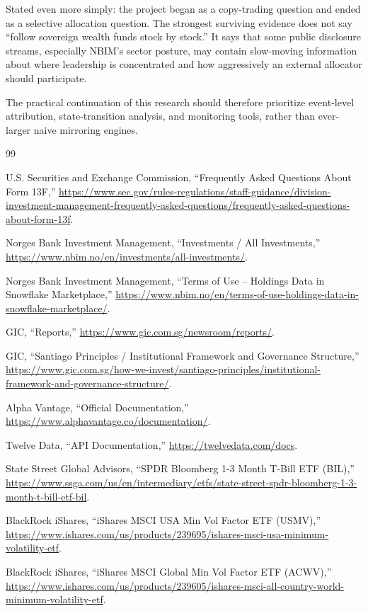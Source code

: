 \documentclass[conference]{IEEEtran}
\begin{document}
Stated even more simply: the project began as a copy-trading question and ended as a selective allocation question. The strongest surviving evidence does not say ``follow sovereign wealth funds stock by stock.'' It says that some public disclosure streams, especially NBIM's sector posture, may contain slow-moving information about where leadership is concentrated and how aggressively an external allocator should participate.

The practical continuation of this research should therefore prioritize event-level attribution, state-transition analysis, and monitoring tools, rather than ever-larger naive mirroring engines.

\begin{thebibliography}{99}

U.S. Securities and Exchange Commission, ``Frequently Asked Questions About Form 13F,'' \url{https://www.sec.gov/rules-regulations/staff-guidance/division-investment-management-frequently-asked-questions/frequently-asked-questions-about-form-13f}.

Norges Bank Investment Management, ``Investments / All Investments,'' \url{https://www.nbim.no/en/investments/all-investments/}.

Norges Bank Investment Management, ``Terms of Use -- Holdings Data in Snowflake Marketplace,'' \url{https://www.nbim.no/en/terms-of-use-holdings-data-in-snowflake-marketplace/}.

GIC, ``Reports,'' \url{https://www.gic.com.sg/newsroom/reports/}.

GIC, ``Santiago Principles / Institutional Framework and Governance Structure,'' \url{https://www.gic.com.sg/how-we-invest/santiago-principles/institutional-framework-and-governance-structure/}.

Alpha Vantage, ``Official Documentation,'' \url{https://www.alphavantage.co/documentation/}.

Twelve Data, ``API Documentation,'' \url{https://twelvedata.com/docs}.

State Street Global Advisors, ``SPDR Bloomberg 1-3 Month T-Bill ETF (BIL),'' \url{https://www.ssga.com/us/en/intermediary/etfs/state-street-spdr-bloomberg-1-3-month-t-bill-etf-bil}.

BlackRock iShares, ``iShares MSCI USA Min Vol Factor ETF (USMV),'' \url{https://www.ishares.com/us/products/239695/ishares-msci-usa-minimum-volatility-etf}.

BlackRock iShares, ``iShares MSCI Global Min Vol Factor ETF (ACWV),'' \url{https://www.ishares.com/us/products/239605/ishares-msci-all-country-world-minimum-volatility-etf}.

\end{thebibliography}
\end{document}
